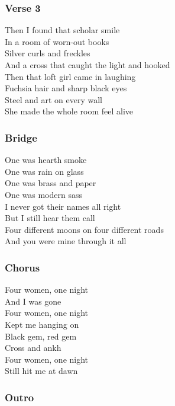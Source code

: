 \subsubsection{Verse 3}\label{verse-3-7}

Then I found that scholar smile\\
In a room of worn-out books\\
Silver curls and freckles\\
And a cross that caught the light and hooked\\
Then that loft girl came in laughing\\
Fuchsia hair and sharp black eyes\\
Steel and art on every wall\\
She made the whole room feel alive

\subsubsection{Bridge}\label{bridge-12}

One was hearth smoke\\
One was rain on glass\\
One was brass and paper\\
One was modern sass\\
I never got their names all right\\
But I still hear them call\\
Four different moons on four different roads\\
And you were mine through it all

\subsubsection{Chorus}\label{chorus-38}

Four women, one night\\
And I was gone\\
Four women, one night\\
Kept me hanging on\\
Black gem, red gem\\
Cross and ankh\\
Four women, one night\\
Still hit me at dawn

\subsubsection{Outro}\label{outro-2}

